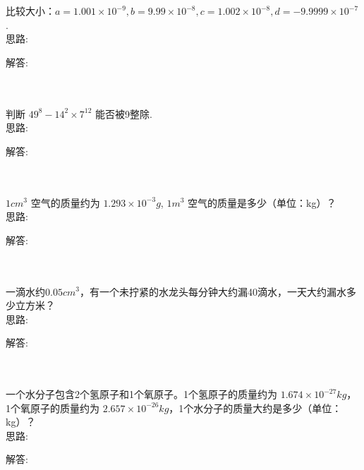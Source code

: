 \item {
    比较大小：$a=1.001\times 10^{-9}, b=9.99\times 10^{-8}, c=1.002\times 10^{-8}, d=-9.9999\times 10^{-7} $.
    \ifshowSolution
        \fangsong{}
        \\
        思路:

        解答: 
    \else
        \\ \\ \\
    \fi
}

\item {
    判断 $49^{8} - 14^{2}\times 7^{12} $ 能否被9整除.
    \ifshowSolution
        \fangsong{}
        \\
        思路:

        解答: 
    \else
        \\ \\ \\
    \fi
}

\item {
    $1 cm^3$ 空气的质量约为  $1.293\times 10^{-3} g$, $1 m^3$ 空气的质量是多少（单位：kg）？
    \ifshowSolution
        \fangsong{}
        \\
        思路:

        解答: 
    \else
        \\ \\ \\
    \fi
}

\item {
    一滴水约$0.05 cm^3$，有一个未拧紧的水龙头每分钟大约漏40滴水，一天大约漏水多少立方米？
    \ifshowSolution
        \fangsong{}
        \\
        思路:

        解答: 
    \else
        \\ \\ \\
    \fi
}

\item {
    一个水分子包含2个氢原子和1个氧原子。1个氢原子的质量约为 $1.674\times 10^{-27} kg$，1个氧原子的质量约为 $2.657\times 10^{-26} kg$，1个水分子的质量大约是多少（单位：kg）？
    \ifshowSolution
        \fangsong{}
        \\
        思路:

        解答: 
    \else
        \\ \\ \\
    \fi
}


